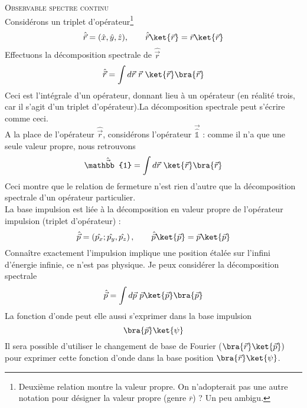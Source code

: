 \textsc{Observable spectre continu}\\
Considérons un triplet d'opérateur\footnote{Deuxième relation montre la valeur 
propre. On n'adopterait pas une autre notation pour désigner la valeur propre 
(genre $\overline{r}$) ? Un peu ambigu.}
\begin{equation}
\hat{\vec{r}} = (\hat{x},\hat{y},\hat{z}),\qquad \hat{\vec{r}}\ket{\vec{r}} = 
\vec{r}\ket{\vec{r}}
\end{equation}
Effectuons la décomposition spectrale de $\hat{\vec{r}}$
\begin{equation}
\hat{\vec{r}} = \int d\vec{r}\ \vec{r}\ \ket{\vec{r}}\bra{\vec{r}}
\end{equation}
Ceci est l'intégrale d'un opérateur, donnant lieu à un opérateur (en réalité 
trois, car il s'agit d'un triplet d'opérateur).La décomposition spectrale peut 
s'écrire comme ceci. \\
A la place de l'opérateur $\hat{\vec r}$, considérons l'opérateur $\vec\hat{\mathbb{
1}}$ : comme il n'a que une seule valeur propre, nous retrouvons
\begin{equation}
\hat{\vec{\mathbb{1}}} = \int d\vec{r}\ \ket{\vec{r}}\bra{\vec{r}}
\end{equation}
Ceci montre que le relation de fermeture n'est rien d'autre que la 
décomposition spectrale d'un opérateur particulier.\\

La base impulsion est liée à la décomposition en valeur propre de l'opérateur 
impulsion (triplet d'opérateur) :
\begin{equation}
\hat{\vec{p}} = \left(\hat{p_x};\hat{p_y},\hat{p_z}\right),\qquad \hat{
\vec{p}}\ket{\vec{p}} = \vec{p}\ket{\vec{p}}
\end{equation}
Connaître exactement l'impulsion implique une position étalée sur l'infini 
d'énergie infinie, ce n'est pas physique. Je peux considérer la décomposition 
spectrale
\begin{equation}
\hat{\vec{p}} = \int d\vec{p}\ \vec{p} \ket{\vec{p}}\bra{\vec{p}}
\end{equation}
La fonction d'onde peut elle aussi s'exprimer dans la base impulsion
\begin{equation}
\bra{\vec{p}}\ket{\psi}
\end{equation}
Il sera possible d'utiliser le changement de base de Fourier ($\bra{\vec{r}}\ket{
\vec{p}})$ pour exprimer cette fonction d'onde dans la base position 
$\bra{\vec{r}}\ket{\psi}$.\\

